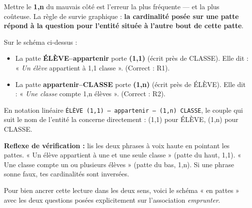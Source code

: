 \documentclass[11pt]{article}
\begin{document}
\begin{attention}
Mettre le \textbf{1,n} du mauvais côté est l'erreur la plus fréquente — et la plus coûteuse. La règle de survie graphique : \textbf{la cardinalité posée sur une patte répond à la question pour l'entité située à l'autre bout de cette patte}.

Sur le schéma ci-dessus :
\begin{itemize}
\item La patte \textbf{ÉLÈVE--appartenir} porte \textbf{(1,1)} (écrit près de CLASSE). Elle dit : « \emph{Un élève} appartient à 1,1 classe ». (Correct : R1).
\item La patte \textbf{appartenir--CLASSE} porte \textbf{(1,n)} (écrit près de ÉLÈVE). Elle dit : « \emph{Une classe} compte 1,n élèves ». (Correct : R2).
\end{itemize}
En notation linéaire \texttt{ÉLÈVE (1,1) — appartenir — (1,n) CLASSE}, le couple qui suit le nom de l'entité la concerne directement : (1,1) pour ÉLÈVE, (1,n) pour CLASSE.

\textbf{Reflexe de vérification :} lis les deux phrases à voix haute en pointant les pattes. « Un élève appartient à une et une seule classe » (patte du haut, 1,1). « Une classe compte un ou plusieurs élèves » (patte du bas, 1,n). Si une phrase sonne faux, tes cardinalités sont inversées.
\end{attention}

Pour bien ancrer cette lecture dans les deux sens, voici le schéma « en pattes » avec les deux questions posées explicitement sur l'association \emph{emprunter}.
\end{document}
